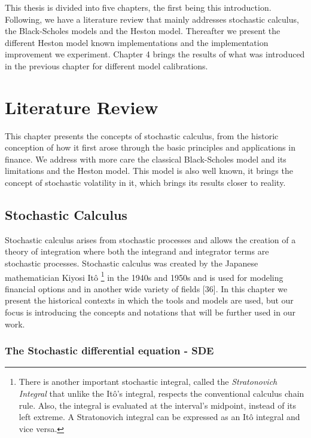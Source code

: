 \documentclass[12pt,twoside]{reedthesis}
\theoremstyle{definition}
\theoremstyle{definition}
\theoremstyle{remark}
\begin{document}
  This thesis is divided into five chapters, the first being this
  introduction. Following, we have a literature review that mainly
  addresses stochastic calculus, the Black-Scholes models and the Heston
  model. Thereafter we present the different Heston model known
  implementations and the implementation improvement we experiment.
  Chapter 4 brings the results of what was introduced in the previous
  chapter for different model calibrations.
  
  \chapter{Literature Review}\label{lt-review}
  
  This chapter presents the concepts of stochastic calculus, from the
  historic conception of how it first arose through the basic principles
  and applications in finance. We address with more care the classical
  Black-Scholes model and its limitations and the Heston model. This model
  is also well known, it brings the concept of stochastic volatility in
  it, which brings its results closer to reality.
  
  \section{Stochastic Calculus}\label{stochastic-calculus}
  
  Stochastic calculus arises from stochastic processes and allows the
  creation of a theory of integration where both the integrand and
  integrator terms are stochastic processes. Stochastic calculus was
  created by the Japanese mathematician Kiyosi Itô
  \footnote{There is another important stochastic integral, called the \textit{Stratonovich Integral} that unlike the Itô's integral, respects the conventional calculus chain rule. Also, the integral is evaluated at the interval's midpoint, instead of its left extreme. A Stratonovich integral can be expressed as an Itô integral and vice versa.}
  in the 1940s and 1950s and is used for modeling financial options and in
  another wide variety of fields {[}36{]}. In this chapter we present the
  historical contexts in which the tools and models are used, but our
  focus is introducing the concepts and notations that will be further
  used in our work.
  
  \subsection{The Stochastic differential equation -
  SDE}\label{the-stochastic-differential-equation---sde}
  
\end{document}
